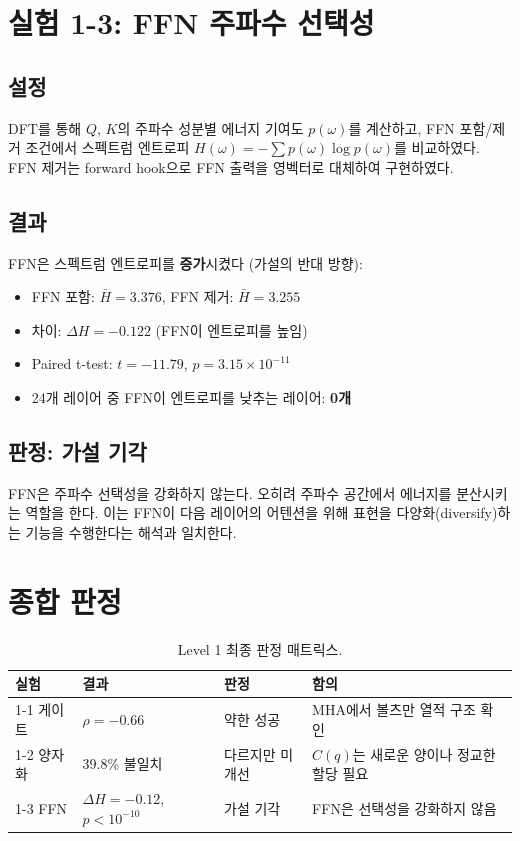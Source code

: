 \documentclass[11pt,a4paper]{article}
\begin{document}
\section{실험 1-3: FFN 주파수 선택성}

\subsection{설정}
DFT를 통해 $Q$, $K$의 주파수 성분별 에너지 기여도 $p(\omega)$를 계산하고, FFN 포함/제거 조건에서 스펙트럼 엔트로피 $H(\omega) = -\sum p(\omega) \log p(\omega)$를 비교하였다.
FFN 제거는 forward hook으로 FFN 출력을 영벡터로 대체하여 구현하였다.

\subsection{결과}
FFN은 스펙트럼 엔트로피를 \textbf{증가}시켰다 (가설의 반대 방향):
\begin{itemize}[nosep]
  \item FFN 포함: $\bar{H} = 3.376$, FFN 제거: $\bar{H} = 3.255$
  \item 차이: $\Delta H = -0.122$ (FFN이 엔트로피를 높임)
  \item Paired t-test: $t = -11.79$, $p = 3.15 \times 10^{-11}$
  \item 24개 레이어 중 FFN이 엔트로피를 낮추는 레이어: \textbf{0개}
\end{itemize}

\subsection{판정: \textcolor{failure}{가설 기각}}
FFN은 주파수 선택성을 강화하지 않는다. 오히려 주파수 공간에서 에너지를 분산시키는 역할을 한다.
이는 FFN이 다음 레이어의 어텐션을 위해 표현을 다양화(diversify)하는 기능을 수행한다는 해석과 일치한다.

\section{종합 판정}

\begin{table}[H]
\centering
\caption{Level 1 최종 판정 매트릭스.}
\begin{tabularx}{\textwidth}{lll>{\raggedright\arraybackslash}X}
\toprule
\textbf{실험} & \textbf{결과} & \textbf{판정} & \textbf{함의} \\
\midrule
1-1 게이트 & $\rho=-0.66$ & \textcolor{partial}{약한 성공} & MHA에서 볼츠만 열적 구조 확인 \\
1-2 양자화 & 39.8\% 불일치 & \textcolor{partial}{다르지만 미개선} & $C(q)$는 새로운 양이나 정교한 할당 필요 \\
1-3 FFN & $\Delta H=-0.12$, $p<10^{-10}$ & \textcolor{failure}{가설 기각} & FFN은 선택성을 강화하지 않음 \\
\bottomrule
\end{tabularx}
\end{table}
\end{document}
